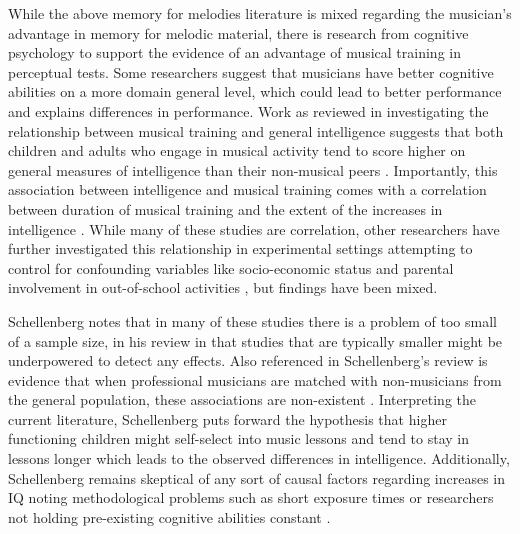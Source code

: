 \documentclass[12pt,]{book}
\begin{document}
While the above memory for melodies literature is mixed regarding the musician's advantage in memory for melodic material, there is research from cognitive psychology to support the evidence of an advantage of musical training in perceptual tests.
Some researchers suggest that musicians have better cognitive abilities on a more domain general level, which could lead to better performance and explains differences in performance.
Work as reviewed in \citet{schellenbergMusicNonmusicalAbilities2017} investigating the relationship between musical training and general intelligence suggests that both children and adults who engage in musical activity tend to score higher on general measures of intelligence than their non-musical peers \citep{gibsonEnhancedDivergentThinking2009, hilleAssociationsMusicEducation2011, schellenbergExaminingAssociationMusic2011, schellenbergMusicTrainingEmotion2012}.
Importantly, this association between intelligence and musical training comes with a correlation between duration of musical training and the extent of the increases in intelligence \citep{corrigallMusicTrainingCognition2013, corrigallPredictingWhoTakes2015, degeMusicLessonsIntelligence2011, schellenbergLongtermPositiveAssociations2006}.
While many of these studies are correlation, other researchers have further investigated this relationship in experimental settings attempting to control for confounding variables like socio-economic status and parental involvement in out-of-school activities \citep{corrigallMusicTrainingCognition2013, degeMusicLessonsIntelligence2011, schellenbergExaminingAssociationMusic2011, schellenbergLongtermPositiveAssociations2006, schellenbergMusicTrainingEmotion2012}, but findings have been mixed.

Schellenberg \citep{schellenbergMusicNonmusicalAbilities2017} notes that in many of these studies there is a problem of too small of a sample size, in his review \citep{corrigallAssociationsLengthMusic2011, parbery-clarkMusicalExperienceAging2011, straitMusicalTrainingEarly2012} in that studies that are typically smaller might be underpowered to detect any effects.
Also referenced in Schellenberg's review is evidence that when professional musicians are matched with non-musicians from the general population, these associations are non-existent \citep{schellenbergMusicTrainingSpeech2015}.
Interpreting the current literature, Schellenberg puts forward the hypothesis that higher functioning children might self-select into music lessons and tend to stay in lessons longer which leads to the observed differences in intelligence.
Additionally, Schellenberg remains skeptical of any sort of causal factors regarding increases in IQ \citep{francoisMusicTrainingDevelopment2013, morenoMusicalTrainingInfluences2009} noting methodological problems such as short exposure times or researchers not holding pre-existing cognitive abilities constant \citep{mehrTwoRandomizedTrials2013}.
\end{document}
